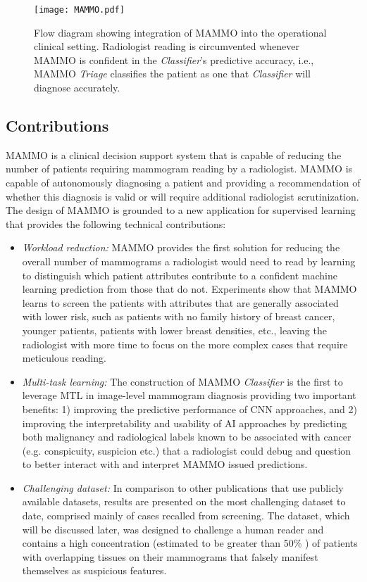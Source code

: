 \documentclass[journal]{IEEEtran}
\begin{document}
\begin{figure}[t]
  \texttt{[image: MAMMO.pdf]}
  \caption{Flow diagram showing integration of MAMMO into the operational clinical setting.  Radiologist reading is circumvented whenever MAMMO is confident in the \textit{Classifier}'s predictive accuracy, i.e., MAMMO \textit{Triage} classifies the patient as one that \textit{Classifier} will diagnose accurately.}
  \label{fig:mammo}
\end{figure}

\subsection{Contributions}

MAMMO is a clinical decision support system that is capable of reducing the number of patients requiring mammogram reading by a radiologist. MAMMO is capable of autonomously diagnosing a patient and providing a recommendation of whether this diagnosis is valid or will require additional radiologist scrutinization.  %
The design of MAMMO is grounded to a new application for supervised learning that provides the following technical contributions:

\begin{itemize}
    \item \textit{Workload reduction:} MAMMO provides the first solution for reducing the overall number of mammograms a radiologist would need to read by learning to distinguish which patient attributes contribute to a confident machine learning prediction from those that do not.  Experiments show that MAMMO learns to screen the patients with attributes that are generally associated with lower risk, such as patients with no family history of breast cancer, younger patients, patients with lower breast densities, etc., leaving the radiologist with more time to focus on the more complex cases that require meticulous reading.  
    \item \textit{Multi-task learning:} The construction of MAMMO \textit{Classifier} is the first to leverage MTL in image-level mammogram diagnosis providing two important benefits: 1) improving the predictive performance of CNN approaches, and 2) improving the interpretability and usability of AI approaches by predicting both malignancy and radiological labels known to be associated with cancer (e.g. conspicuity, suspicion etc.) that a radiologist could debug and question to better interact with and interpret MAMMO issued predictions.
    
    \item \textit{Challenging dataset:} In comparison to other publications that use publicly available datasets, results are presented on the most challenging dataset to date, comprised mainly of cases recalled from screening.  The dataset, which will be discussed later, was designed to challenge a human reader and contains a high concentration (estimated to be greater than 50\% \cite{tommy-2015}) of patients with overlapping tissues on their mammograms that falsely manifest themselves as suspicious features.  

\end{itemize}
\end{document}
